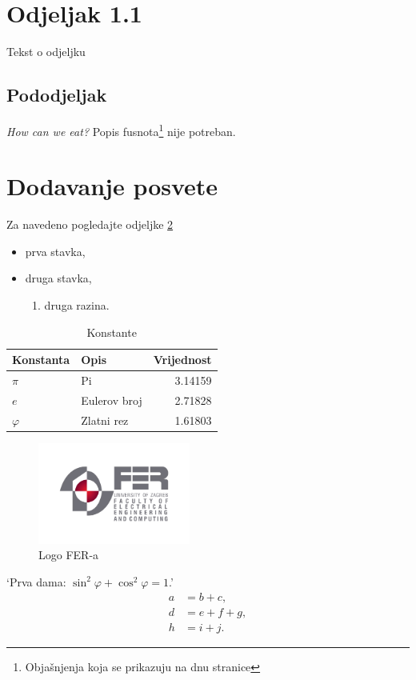 \documentclass[times, utf8, diplomski]{fer}
\begin{document}
{\section{Odjeljak 1.1}
Tekst o odjeljku
\subsection{Pododjeljak}
\emph{How can we eat?}
Popis fusnota\footnote{Objašnjenja koja se prikazuju
na dnu stranice} nije potreban.
\section{Dodavanje posvete}
\label{sec:posveta}
Za navedeno pogledajte odjeljke \ref{sec:posveta}
\begin{itemize}
	\item prva stavka,
	\item druga stavka,
	\begin{enumerate}
		\item druga razina.
	\end{enumerate}
\end{itemize}

\begin{table}[htb]
\caption{Konstante}
\label{tbl:konstante}
\centering
\begin{tabular}{llr} \toprule
Konstanta & Opis & Vrijednost\\ \midrule
$\pi$ & Pi & 3.14159 \\
$e$ & Eulerov broj & 2.71828 \\
$\varphi$ & Zlatni rez & 1.61803 \\ \bottomrule
\end{tabular}
\end{table}

\begin{figure}[htb]
\centering
\includegraphics[width=5cm]{img/fer_logo.jpg}
\caption{Logo FER-a}
\label{fig:fer-logo}
\end{figure}

‘Prva dama: $\sin^2 \varphi + \cos^2 \varphi = 1$.’ \citep{ungar2002uvod} \cite{oetiket2007lshort}
\begin{align}
a&=b+c,\label{eq:a}\\
d&=e+f+g,\\
h&=i+j.\label{eq:h}
\end{align}

}
\end{document}
